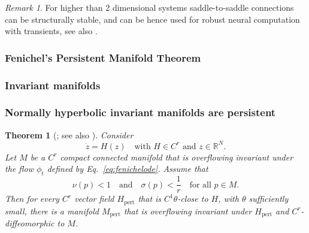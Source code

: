 \documentclass{article}
\newtheorem{theorem}{Theorem}
\theoremstyle{definition} \newtheorem{definition}{Definition}
\theoremstyle{remark} \newtheorem{remark}{Remark}
\newcounter{ct}
\begin{document}
\begin{remark}
For higher than 2 dimensional systems saddle-to-saddle connections can be structurally stable, and can be hence used for robust neural computation with transients, see also \cite{rabinovich2008transient}.
\end{remark}








\subsubsection{Fenichel's Persistent Manifold Theorem}\label{sec:fenichel}

\subsubsection{Invariant manifolds}\label{sec:invman}
\citep{roberts1989invariant,
kalitin2021attractors}

\citep{hirsch1970invariant}
\citep{wiggins1994nhim}
\citep{jones1995gspt}
\citep{kuehn2015multipletimescale}


\subsubsection{Normally hyperbolic invariant manifolds are persistent}
\begin{theorem}[\citep{fenichel1971persistence}; see also \citep{kuehn2015multipletimescale}]
 Consider
\begin{equation}\label{eq:fenichelode}
\dot{z} = H(z) \quad \text{with } H \in C^r \text{ and } z \in \mathbb{R}^N. 
\end{equation}
Let \( M \) be a \( C^r \) compact connected manifold that is overflowing invariant under the flow \( \phi_t \) defined by Eq.~\ref{eq:fenichelode}. Assume that
\begin{equation}
\nu(p) < 1 \quad \text{and} \quad \sigma(p) < \frac{1}{r} \quad \text{for all } p \in M. 
\end{equation}
Then for every \( C^r \) vector field \( H_{\text{pert}} \) that is \( C^1 \theta \)-close to \( H \), with \( \theta \) sufficiently small, there is a manifold \( M_{\text{pert}} \) that is overflowing invariant under \( H_{\text{pert}} \) and \( C^r \)-diffeomorphic to \( M \).
\end{theorem}
\end{document}
